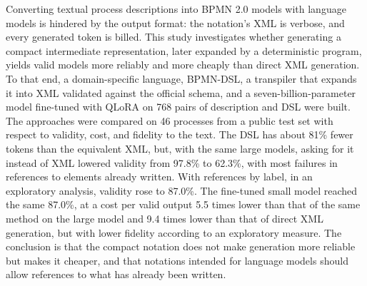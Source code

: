 Converting textual process descriptions into BPMN 2.0 models with language models is hindered by the output format: the notation's XML is verbose, and every generated token is billed. This study investigates whether generating a compact intermediate representation, later expanded by a deterministic program, yields valid models more reliably and more cheaply than direct XML generation. To that end, a domain-specific language, BPMN-DSL, a transpiler that expands it into XML validated against the official schema, and a seven-billion-parameter model fine-tuned with QLoRA on 768 pairs of description and DSL were built. The approaches were compared on 46 processes from a public test set with respect to validity, cost, and fidelity to the text. The DSL has about 81\% fewer tokens than the equivalent XML, but, with the same large models, asking for it instead of XML lowered validity from 97.8\% to 62.3\%, with most failures in references to elements already written. With references by label, in an exploratory analysis, validity rose to 87.0\%. The fine-tuned small model reached the same 87.0\%, at a cost per valid output 5.5 times lower than that of the same method on the large model and 9.4 times lower than that of direct XML generation, but with lower fidelity according to an exploratory measure. The conclusion is that the compact notation does not make generation more reliable but makes it cheaper, and that notations intended for language models should allow references to what has already been written.

